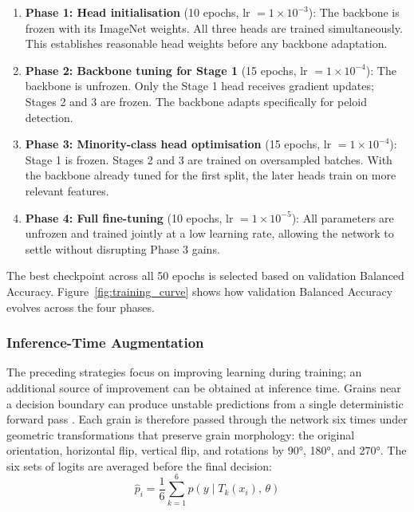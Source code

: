 \documentclass[a4paper,fleqn]{cas-dc}
\begin{document}
\begin{enumerate}
  \item \textbf{Phase 1: Head initialisation} (10 epochs, lr $= 1\times10^{-3}$): The backbone is frozen with its ImageNet weights. All three heads are trained simultaneously. This establishes reasonable head weights before any backbone adaptation.

  \item \textbf{Phase 2: Backbone tuning for Stage 1} (15 epochs, lr $= 1\times10^{-4}$): The backbone is unfrozen. Only the Stage 1 head receives gradient updates; Stages 2 and 3 are frozen. The backbone adapts specifically for peloid detection.

  \item \textbf{Phase 3: Minority-class head optimisation} (15 epochs, lr $= 1\times10^{-4}$): Stage 1 is frozen. Stages 2 and 3 are trained on oversampled batches. With the backbone already tuned for the first split, the later heads train on more relevant features.

  \item \textbf{Phase 4: Full fine-tuning} (10 epochs, lr $= 1\times10^{-5}$): All parameters are unfrozen and trained jointly at a low learning rate, allowing the network to settle without disrupting Phase 3 gains.
\end{enumerate}

The best checkpoint across all 50 epochs is selected based on validation Balanced Accuracy. Figure~\ref{fig:training_curve} shows how validation Balanced Accuracy evolves across the four phases.

\subsubsection{Inference-Time Augmentation}
\label{sec:tta}

The preceding strategies focus on improving learning during training; an additional source of improvement can be obtained at inference time. Grains near a decision boundary can produce unstable predictions from a single deterministic forward pass \citep{shanmugam2021tta}. Each grain is therefore passed through the network six times under geometric transformations that preserve grain morphology: the original orientation, horizontal flip, vertical flip, and rotations by 90°, 180°, and 270°. The six sets of logits are averaged before the final decision:
\begin{equation}
\hat{p}_i = \frac{1}{6}\sum_{k=1}^{6} p\!\left(y \mid T_k(x_i),\, \theta\right)
\end{equation}
\end{document}
